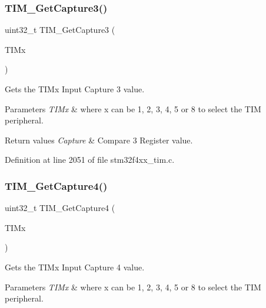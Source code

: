 \subsubsection{\texorpdfstring{T\+I\+M\+\_\+\+Get\+Capture3()}{TIM\_GetCapture3()}}
{\footnotesize\ttfamily uint32\+\_\+t T\+I\+M\+\_\+\+Get\+Capture3 (\begin{DoxyParamCaption}\item[{\hyperlink{struct_t_i_m___type_def}{T\+I\+M\+\_\+\+Type\+Def} $\ast$}]{T\+I\+Mx }\end{DoxyParamCaption})}



Gets the T\+I\+Mx Input Capture 3 value. 


\begin{DoxyParams}{Parameters}
{\em T\+I\+Mx} & where x can be 1, 2, 3, 4, 5 or 8 to select the T\+IM peripheral. \\
\hline
\end{DoxyParams}

\begin{DoxyRetVals}{Return values}
{\em Capture} & Compare 3 Register value. \\
\hline
\end{DoxyRetVals}


Definition at line 2051 of file stm32f4xx\+\_\+tim.\+c.

\mbox{\label{group___t_i_m_ga420b022cbc71ac603b5dd4922687abb1}} 
\subsubsection{\texorpdfstring{T\+I\+M\+\_\+\+Get\+Capture4()}{TIM\_GetCapture4()}}
{\footnotesize\ttfamily uint32\+\_\+t T\+I\+M\+\_\+\+Get\+Capture4 (\begin{DoxyParamCaption}\item[{\hyperlink{struct_t_i_m___type_def}{T\+I\+M\+\_\+\+Type\+Def} $\ast$}]{T\+I\+Mx }\end{DoxyParamCaption})}



Gets the T\+I\+Mx Input Capture 4 value. 


\begin{DoxyParams}{Parameters}
{\em T\+I\+Mx} & where x can be 1, 2, 3, 4, 5 or 8 to select the T\+IM peripheral. \\
\hline
\end{DoxyParams}

